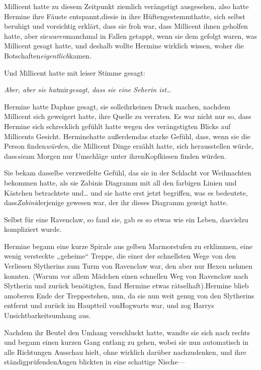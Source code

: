 {Millicent hatte zu diesem Zeitpunkt ziemlich verängstigt ausgesehen, also hatte Hermine ihre Fäuste entspannt,diesie in ihre Hüftengestemmthatte, sich selbst beruhigt und vorsichtig erklärt, dass sie froh war, dass Millicent ihnen geholfen hatte, aber sie\emph{waren}manchmal in Fallen getappt, wenn sie dem gefolgt waren, was Millicent gesagt hatte, und deshalb wollte Hermine wirklich wissen, woher die Botschaften\emph{eigentlich}kamen.

Und Millicent hatte mit leiser Stimme gesagt:

\emph{Aber, aber sie hat}mir\emph{gesagt, dass sie eine Seherin ist}…

Hermine hatte Daphne gesagt, sie solleihrkeinen Druck machen, nachdem Millicent sich geweigert hatte, ihre Quelle zu verraten. Es war nicht nur so, dass Hermine sich schrecklich gefühlt hatte wegen des verängstigten Blicks auf Millicents Gesicht. Herminehatte außerdemdas starke Gefühl, dass, wenn sie die Person finden\emph{würden}, die Millicent Dinge erzählt hatte, sich herausstellen würde, dass\emph{sie}am Morgen nur Umschläge unter ihrenKopfkissen finden würden.

Sie bekam dasselbe verzweifelte Gefühl, das sie in der Schlacht vor Weihnachten bekommen hatte, als sie Zabinis Diagramm mit all den farbigen Linien und Kästchen betrachtete und… und sie hatte erst jetzt begriffen, was es bedeutete, dass\emph{Zabini}derjenige gewesen war, der ihr dieses Diagramm gezeigt hatte.

Selbst für eine Ravenclaw, so fand sie, gab es so etwas wie ein Leben, dasvielzu kompliziert wurde.

Hermine begann eine kurze Spirale aus gelben Marmorstufen zu erklimmen, eine wenig versteckte „geheime“ Treppe, die einer der schnellsten Wege von den Verliesen Slytherins zum Turm von Ravenclaw war, den aber nur Hexen nehmen konnten. (Warum vor allem Mädchen einen schnellen Weg von Ravenclaw nach Slytherin und zurück benötigten, fand Hermine etwas rätselhaft).Hermine blieb amoberen Ende der Treppestehen, nun, da sie nun weit genug von den Slytherins entfernt und zurück im Hauptteil vonHogwarts war, und zog Harrys Unsichtbarkeitsumhang aus.

Nachdem ihr Beutel den Umhang verschluckt hatte, wandte sie sich nach rechts und begann einen kurzen Gang entlang zu gehen, wobei sie nun automatisch in alle Richtungen Ausschau hielt, ohne wirklich darüber nachzudenken, und ihre ständigprüfendenAugen blickten in eine schattige Nische—

}
